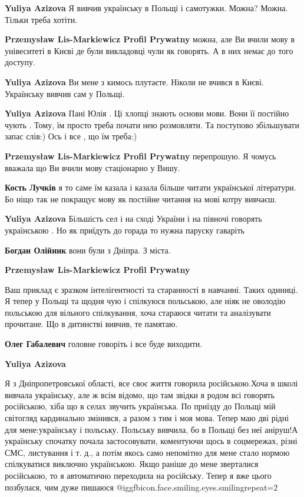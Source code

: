\begin{itemize}
\begin{itemize} %
\textbf{Yuliya Azizova} Я вивчив українську в Польщі і самотужки. Можна? Можна. Тільки треба хотіти.

\textbf{Przemysław Lis-Markiewicz Profil Prywatny} можна, але Ви вчили мову в унівеситеті в Києві де були викладовці чули як говорять. А в них немає до того доступу.

\textbf{Yuliya Azizova} Ви мене з кимось плутаєте. Ніколи не вчився в Києві. Українську вивчив сам у Польщі.

\textbf{Yuliya Azizova} Пані Юлія . Ці хлопці знають основи мови. Вони її постійно чують . Тому, їм просто треба почати нею розмовляти. Та поступово збільшувати запас слів:)
Ось і все , що їм треба:)

\textbf{Przemysław Lis-Markiewicz Profil Prywatny} перепрошую. Я чомусь вважала що Ви вчили мову стаціонарно у Вишу.

\textbf{Кость Лучків} я то саме їм казала і казала більше читати української літератури. Бо ніщо так не покращує мову як постійне читання на мові котру вивчаєш.

\textbf{Yuliya Azizova} Більшість сел і на сході України і на півночі говорять українською . Но як приїдуть до горада то нужна паруску гаваріть

\textbf{Богдан Олійник} вони були з Дніпра. З міста.

\textbf{Przemysław Lis-Markiewicz Profil Prywatny} 

Ваш приклад є зразком інтелігентності та старанності в навчанні. Таких одиниці.
Я тепер у Польщі та щодня чую і спілкуюся польською, але ніяк не оволодію
польською для вільного спілкування, хоча стараюся читати та аналізувати
прочитане. Що в дитинстві вивчив, те памятаю.

\textbf{Олег Габалевич} головне говоріть і все буде виходити.

\textbf{Yuliya Azizova} 

Я з Дніпропетровської області, все своє життя говорила російською.Хоча в школі
вивчала українську, але ж всім відомо, що там звідки я родом всі говорять
російською, хіба що в селах звучить українська. По приїзду до Польщі мій
світогляд кардинально змінився, а разом з тим і моя мова. Тепер маю дві рідні
для мене:українську і польську. Польську вивчила, бо в Польщі без неї аніруш!А
українську спочатку почала застосовувати, коментуючи щось в соцмережах, різні
СМС, листування і т. д., а потім якось само непомітно для мене стало нормою
спілкуватися виключно українською. Якщо раніше до мене зверталися російською,
то я автоматично переходила на російську. Тепер я вже цього позбулася, чим дуже
пишаюся @igg{fbicon.face.smiling.eyes.smiling}{repeat=2} 


\end{itemize}
\end{itemize}
